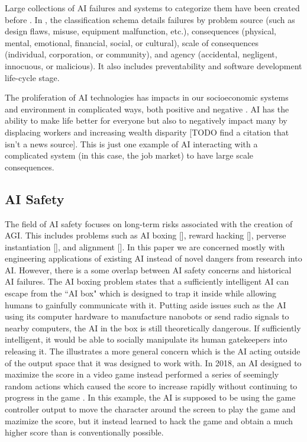 \documentclass[11pt]{article}
\begin{document}
Large collections of AI failures and systems to categorize them have been created before
\cite{yam2018historic} \cite{scott2020classification}. In \cite{scott2020classification}, the
classification schema details failures by problem source (such as design flaws, misuse, equipment
malfunction, etc.), consequences (physical, mental, emotional, financial, social, or
cultural), scale of consequences (individual, corporation, or community), and agency (accidental,
negligent, innocuous, or malicious). It also includes preventability and software development
life-cycle stage.

The proliferation of AI technologies has impacts in our socioeconomic systems and environment in
complicated ways, both positive and negative \cite{jayden2018sustainability}. AI has the ability to
make life better for everyone but also to negatively impact many by displacing workers and
increasing wealth disparity [TODO find a citation that isn't a news source]. This is just one
example of AI interacting with a complicated system (in this case, the job market) to have large
scale consequences. 

\subsection{AI Safety}

The field of AI safety focuses on long-term risks associated with the creation of AGI. This includes
problems such as AI boxing [], reward hacking [], perverse instantiation [], and alignment []. In
this paper we are concerned mostly with engineering applications of existing AI instead of novel
dangers from research into AI. However, there is a some overlap between AI safety concerns
and historical AI failures. The AI boxing problem states that a sufficiently intelligent AI can
escape from the ``AI box" which is designed to trap it inside while allowing humans to gainfully
communicate with it. Putting aside issues such as the AI using its computer hardware to manufacture
nanobots or send radio signals to nearby computers, the AI in the box is still theoretically
dangerous. If sufficiently intelligent, it would be able to socially manipulate its human
gatekeepers into releasing it. The illustrates a more general concern which is the AI acting outside
of the output space that it was designed to work with. In 2018, an AI designed to maximize the score
in a video game instead performed a series of seemingly random actions which caused the score to
increase rapidly without continuing to progress in the game \cite{chrabaszcz2018qbert}. In this
example, the AI is supposed to be using the game controller output to move the character around the
screen to play the game and mazimize the score, but it instead learned to hack the game and obtain
a much higher score than is conventionally possible.
\end{document}
